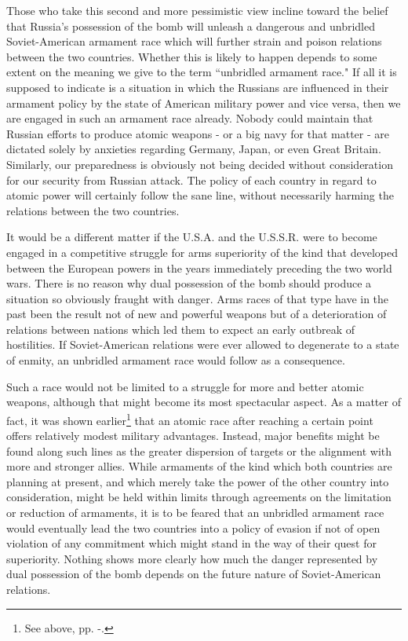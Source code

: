 Those who take this second and more pessimistic view incline toward the belief that Russia's possession of the bomb will unleash a dangerous and unbridled Soviet-American armament race which will further strain and poison relations between the two countries. Whether this is likely to happen depends to some extent on the meaning we give to the term ``unbridled armament race." If all it is supposed to indicate is a situation in which the Russians are influenced in their armament policy by the state of American military power and vice versa, then we are engaged in such an armament race already. Nobody could maintain that Russian efforts to produce atomic weapons - or a big navy for that matter - are dictated solely by anxieties regarding Germany, Japan, or even Great Britain. Similarly, our preparedness is obviously not being decided without consideration for our security from Russian attack. The policy of each country in regard to atomic power will certainly follow the sane line, without necessarily harming the relations between the two countries.

It would be a different matter if the U.S.A. and the U.S.S.R. were to become engaged in a competitive struggle for arms superiority of the kind that developed between the European powers in the years immediately preceding the two world wars. There is no reason why dual possession of the bomb should produce a situation so obviously fraught with danger. Arms races of that type have in the past been the result not of new and powerful weapons but of a deterioration of relations between nations which led them to expect an early outbreak of hostilities. If Soviet-American relations were ever allowed to degenerate to a state of enmity, an unbridled armament race would follow as a consequence.

Such a race would not be limited to a struggle for more and better atomic weapons, although that might become its most spectacular aspect. As a matter of fact, it was shown earlier\footnote{See above, pp. \pageref{I-SuperiorNos1}-\pageref{I-SuperiorNos2}.} that an atomic race after reaching a certain point offers relatively modest military advantages. Instead, major benefits might be found along such lines as the greater dispersion of targets or the alignment with more and stronger allies. While armaments of the kind which both countries are planning at present, and which merely take the power of the other country into consideration, might be held within limits through agreements on the limitation or reduction of armaments, it is to be feared that an unbridled armament race would eventually lead the two countries into a policy of evasion if not of open violation of any commitment which might stand in the way of their quest for superiority. Nothing shows more clearly how much the danger represented by dual possession of the bomb depends on the future nature of Soviet-American relations.

